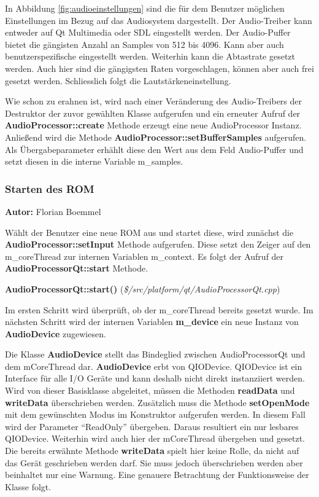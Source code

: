 \documentclass[11pt,a4paper]{scrartcl}
\newcommand{\AutorFlorian} {
    \vspace{-4mm}
    \large \textbf{Autor:} Florian Boemmel \normalsize
    \vspace{2mm}
}
\newcommand{\paratitlecode}[2] {
    \vspace{5mm}
    \large \textbf{#1} \normalsize(\textit{\${#2}})
    \vspace{2mm}\newline
}
\begin{document}
In Abbildung \ref{fig:audioeinstellungen} sind die f\"ur dem Benutzer m\"oglichen Einstellungen im Bezug auf das Audiosystem dargestellt. Der Audio-Treiber kann entweder auf Qt Multimedia oder SDL eingestellt werden.
Der Audio-Puffer bietet die g\"angisten Anzahl an Samples von 512 bis 4096. Kann aber auch benutzerspezifische eingestellt werden. Weiterhin kann die Abtastrate gesetzt werden. Auch hier sind die g\"angigsten Raten vorgeschlagen, k\"onnen
aber auch frei gesetzt werden. Schlie{ss}lich folgt die Lautst\"arkeneinstellung.

Wie schon zu erahnen ist, wird nach einer Ver\"anderung des Audio-Treibers der Destruktor der zuvor gew\"ahlten Klasse aufgerufen und ein erneuter Aufruf der \textbf{AudioProcessor::create} Methode erzeugt eine neue AudioProcessor Instanz.
Anlie{\ss}end wird die Methode \textbf{AudioProcessor::setBufferSamples} aufgerufen. Als \"Ubergabeparameter erh\"ahlt diese den Wert aus dem Feld Audio-Puffer und setzt diesen in die interne Variable m\_samples.


\subsubsection{Starten des ROM}
\AutorFlorian

W\"ahlt der Benutzer eine neue ROM aus und startet diese, wird zun\"achst die \textbf{AudioProcessor::setInput} Methode aufgerufen. Diese setzt den Zeiger auf den m\_coreThread zur internen Variablen m\_context. Es folgt der Aufruf der
\textbf{AudioProcessorQt::start} Methode.

\paratitlecode{AudioProcessorQt::start()}{/src/platform/qt/AudioProcessorQt.cpp}
Im ersten Schritt wird \"uberpr\"uft, ob der m\_coreThread bereits gesetzt wurde. Im n\"achsten Schritt wird der internen Variablen \textbf{m\_device} ein neue Instanz von \textbf{AudioDevice} zugewiesen.

Die Klasse \textbf{AudioDevice} stellt das Bindeglied zwischen AudioProcessorQt und dem mCoreThread dar. \textbf{AudioDevice} erbt von QIODevice. QIODevice ist ein Interface f\"ur alle I/O Ger\"ate und kann deshalb nicht direkt instanziiert werden.
Wird von dieser Basisklasse abgeleitet, m\"ussen die Methoden \textbf{readData} und \textbf{writeData} \"uberschrieben werden. Zus\"atzlich muss die Methode \textbf{setOpenMode} mit dem gew\"unschten Modus im Konstruktor aufgerufen werden. In diesem Fall wird der Parameter \enquote{ReadOnly} \"ubergeben. Daraus resultiert ein nur lesbares QIODevice. Weiterhin wird auch hier der mCoreThread \"ubergeben und gesetzt. Die bereits erw\"ahnte Methode \textbf{writeData} spielt hier keine Rolle, da nicht auf das Ger\"at geschrieben werden darf. Sie muss jedoch \"uberschrieben werden aber beinhaltet nur eine Warnung. Eine genauere Betrachtung der Funktionsweise der Klasse folgt.
\end{document}

